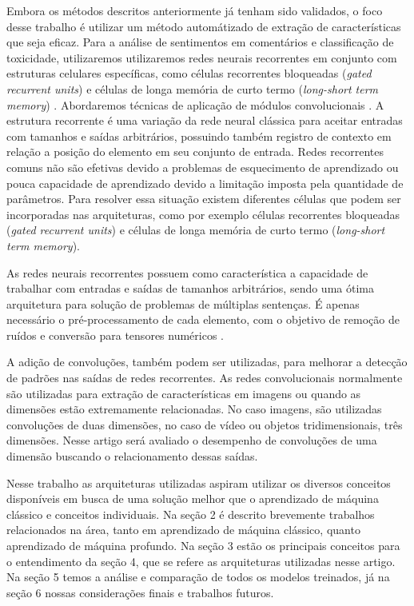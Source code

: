 \documentclass[12pt]{article}
\begin{document}
Embora os métodos descritos anteriormente já tenham sido validados, o foco desse trabalho é utilizar um método automátizado de extração de características que seja eficaz. Para a análise de sentimentos em comentários e classificação de toxicidade, utilizaremos utilizaremos redes neurais recorrentes em conjunto com estruturas celulares específicas, como células recorrentes bloqueadas (\textit{gated recurrent units}) \cite{DBLP:journals/corr/PascanuGCB13} e células de longa memória de curto termo (\textit{long-short term memory}) \cite{sep:97}. Abordaremos técnicas de aplicação de módulos convolucionais \cite{lecun:98}.
A estrutura recorrente é uma variação da rede neural clássica para aceitar entradas com tamanhos e saídas arbitrários, possuindo também registro de contexto em relação a posição do elemento em seu conjunto de entrada. Redes recorrentes comuns não são efetivas devido a problemas de esquecimento de aprendizado ou pouca capacidade de aprendizado devido a limitação imposta pela quantidade de parâmetros. Para resolver essa situação existem diferentes células que podem ser incorporadas nas arquiteturas, como por exemplo células recorrentes bloqueadas (\textit{gated recurrent units}) e células de longa memória de curto termo (\textit{long-short term memory}).

As redes neurais recorrentes possuem como característica a capacidade de trabalhar com entradas e saídas de tamanhos arbitrários, sendo uma ótima arquitetura para solução de problemas de múltiplas sentenças. É apenas necessário o pré-processamento de cada elemento, com o objetivo de remoção de ruídos e conversão para tensores numéricos \cite{karpathy:2015}.

A adição de convoluções, também podem ser utilizadas, para melhorar a detecção de padrões nas saídas de redes recorrentes. As redes convolucionais normalmente são utilizadas para extração de características em imagens \cite{lecun:98} ou quando as dimensões estão extremamente relacionadas. No caso imagens, são utilizadas convoluções de duas dimensões, no caso de vídeo ou objetos tridimensionais, três dimensões. Nesse artigo será avaliado o desempenho de convoluções de uma dimensão buscando o relacionamento dessas saídas.

Nesse trabalho as arquiteturas utilizadas aspiram utilizar os diversos conceitos disponíveis em busca de uma solução melhor que o aprendizado de máquina clássico e conceitos individuais. Na seção 2 é descrito brevemente trabalhos relacionados na área, tanto em aprendizado de máquina clássico, quanto aprendizado de máquina profundo. Na seção 3 estão os principais conceitos para o entendimento da seção 4, que se refere as arquiteturas utilizadas nesse artigo. Na seção 5 temos a análise e comparação de todos os modelos treinados, já na seção 6 nossas considerações finais e trabalhos futuros.
\end{document}
